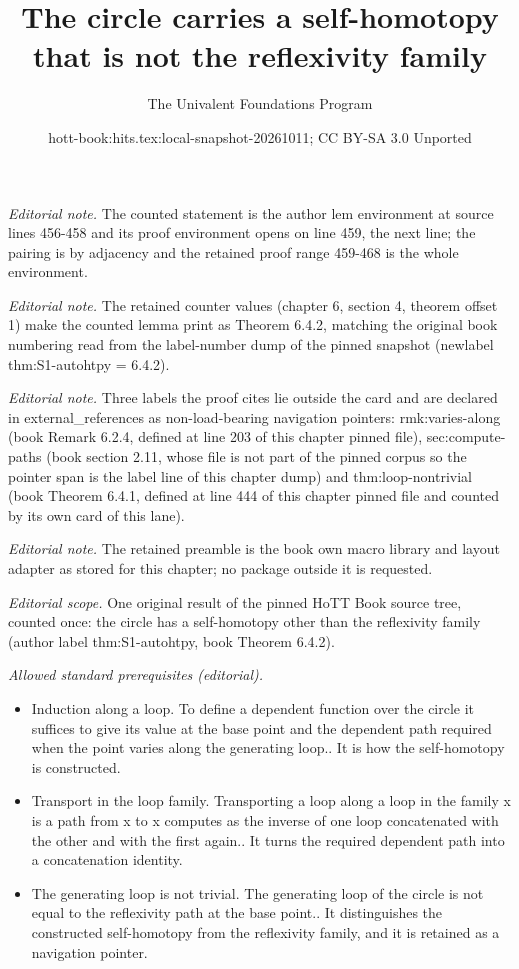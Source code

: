\documentclass[10pt,a4paper]{article}
\title{The circle carries a self-homotopy that is not the reflexivity family}
\author{The Univalent Foundations Program}
\date{hott-book:hits.tex:local-snapshot-20261011; CC BY-SA 3.0 Unported}
\newcounter{chapter}
\theoremstyle{definition}
\theoremstyle{remark}
\numberwithin{equation}{section}
\begin{document}
\maketitle
\setcounter{chapter}{6}
\setcounter{section}{4}
\setcounter{thm}{1}
\noindent\textit{Editorial note.} The counted statement is the author lem environment at source lines 456-458 and its proof environment opens on line 459, the next line; the pairing is by adjacency and the retained proof range 459-468 is the whole environment.\par\medskip
\noindent\textit{Editorial note.} The retained counter values (chapter 6, section 4, theorem offset 1) make the counted lemma print as Theorem 6.4.2, matching the original book numbering read from the label-number dump of the pinned snapshot (newlabel thm:S1-autohtpy = 6.4.2).\par\medskip
\noindent\textit{Editorial note.} Three labels the proof cites lie outside the card and are declared in external\_references as non-load-bearing navigation pointers: rmk:varies-along (book Remark 6.2.4, defined at line 203 of this chapter pinned file), sec:compute-paths (book section 2.11, whose file is not part of the pinned corpus so the pointer span is the label line of this chapter dump) and thm:loop-nontrivial (book Theorem 6.4.1, defined at line 444 of this chapter pinned file and counted by its own card of this lane).\par\medskip
\noindent\textit{Editorial note.} The retained preamble is the book own macro library and layout adapter as stored for this chapter; no package outside it is requested.\par\medskip
\noindent\textit{Editorial scope.} One original result of the pinned HoTT Book source tree, counted once: the circle has a self-homotopy other than the reflexivity family (author label thm:S1-autohtpy, book Theorem 6.4.2).\par\medskip
\noindent\textit{Allowed standard prerequisites (editorial).}\begin{itemize}
\item Induction along a loop. To define a dependent function over the circle it suffices to give its value at the base point and the dependent path required when the point varies along the generating loop.. It is how the self-homotopy is constructed.
\item Transport in the loop family. Transporting a loop along a loop in the family x is a path from x to x computes as the inverse of one loop concatenated with the other and with the first again.. It turns the required dependent path into a concatenation identity.
\item The generating loop is not trivial. The generating loop of the circle is not equal to the reflexivity path at the base point.. It distinguishes the constructed self-homotopy from the reflexivity family, and it is retained as a navigation pointer.
\end{itemize}\medskip
\end{document}
